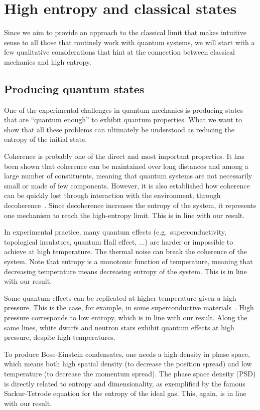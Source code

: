 \documentclass{SciPost}
\begin{document}
\section{High entropy and classical states}

Since we aim to provide an approach to the classical limit that makes intuitive sense to all those that routinely work with quantum systems, we will start with a few qualitative considerations that hint at the connection between classical mechanics and high entropy.

\subsection{Producing quantum states}

One of the experimental challenges in quantum mechanics is producing states that are ``quantum enough'' to exhibit quantum properties. What we want to show that all these problems can ultimately be understood as reducing the entropy of the initial state.

Coherence is probably one of the direct and most important properties. It has been shown that coherence can be maintained over long distances and among a large number of constituents, meaning that quantum systems are not necessarily small or made of few components. However, it is also established how coherence can be quickly lost through interaction with the environment, through decoherence~\cite{RevModPhys.75.715, SCHLOSSHAUER20191}. Since decoherence increases the entropy of the system, it represents one mechanism to reach the high-entropy limit. This is in line with our result.

In experimental practice, many quantum effects (e.g.~superconductivity, topological insulators, quantum Hall effect, ...) are harder or impossible to achieve at high temperature. The thermal noise can break the coherence of the system. Note that entropy is a monotonic function of temperature, meaning that decreasing temperature means decreasing entropy of the system. This is in line with our result.

Some quantum effects can be replicated at higher temperature given a high pressure. This is the case, for example, in some superconductive materials~\cite{Drozdov:2015}. High pressure corresponds to low entropy, which is in line with our result. Along the same lines, white dwarfs and neutron stars exhibit quantum effects at high pressure, despite high temperatures.

To produce Bose-Einstein condensates, one needs a high density in phase space, which means both high spatial density (to decrease the position spread) and low temperature (to decrease the momentum spread). The phase space density (PSD) is directly related to entropy and dimensionality, as exemplified by the famous Sackur-Tetrode equation for the entropy of the ideal gas. This, again, is in line with our result.
\end{document}
